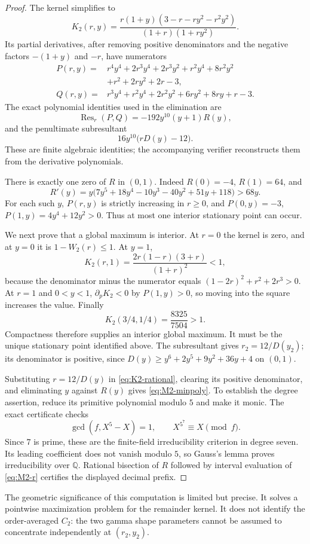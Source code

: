 \begin{proof}
The kernel simplifies to
\begin{equation}\label{eq:K2-rational}
 K_2(r,y)=\frac{r(1+y)(3-r-ry^2-r^2y^2)}{(1+r)(1+ry^2)}.
\end{equation}
Its partial derivatives, after removing positive denominators and
the negative factors $-(1+y)$ and $-r$, have numerators
\begin{align*}
 P(r,y)={}&r^4y^4+2r^3y^4+2r^3y^2+r^2y^4+8r^2y^2\\
          &+r^2+2ry^2+2r-3,\\
 Q(r,y)={}&r^3y^4+r^2y^4+2r^2y^2+6ry^2+8ry+r-3.
\end{align*}
The exact polynomial identities used in the elimination are
\begin{equation}\label{eq:M2-resultant}
 \operatorname{Res}_r(P,Q)=-192y^{10}(y+1)R(y),
\end{equation}
and the penultimate subresultant
\begin{equation}\label{eq:M2-subresultant}
 16y^{10}\bigl(rD(y)-12\bigr).
\end{equation}
These are finite algebraic identities; the accompanying verifier
reconstructs them from the derivative polynomials.

There is exactly one zero of $R$ in $(0,1)$. Indeed $R(0)=-4$,
$R(1)=64$, and
\[
 R'(y)=y\bigl(7y^5+18y^4-10y^3-40y^2+51y+118\bigr)>68y.
\]
For each such $y$, $P(r,y)$ is strictly increasing in $r\ge0$,
and $P(0,y)=-3$, $P(1,y)=4y^4+12y^2>0$. Thus at most one
interior stationary point can occur.

We next prove that a global maximum is interior. At $r=0$ the
kernel is zero, and at $y=0$ it is $1-W_2(r)\le1$. At $y=1$,
\[
 K_2(r,1)=\frac{2r(1-r)(3+r)}{(1+r)^2}<1,
\]
because the denominator minus the numerator equals
$(1-2r)^2+r^2+2r^3>0$. At $r=1$ and $0<y<1$,
$\partial_pK_2<0$ by $P(1,y)>0$, so moving into the square
increases the value. Finally
\[
 K_2(3/4,1/4)=\frac{8325}{7504}>1.
\]
Compactness therefore supplies an interior global maximum.
It must be the unique stationary point identified above.
The subresultant gives $r_2=12/D(y_2)$; its denominator is positive,
since $D(y)\ge y^6+2y^5+9y^2+36y+4$ on $(0,1)$.

Substituting $r=12/D(y)$ in \eqref{eq:K2-rational}, clearing its
positive denominator, and eliminating $y$ against $R(y)$ gives
\eqref{eq:M2-minpoly}. To establish the degree assertion, reduce its
primitive polynomial modulo $5$ and make it monic. The exact certificate
checks
\[
 \gcd(f,X^5-X)=1,\qquad X^{5^7}\equiv X\pmod f.
\]
Since $7$ is prime, these are the finite-field irreducibility criterion
in degree seven. Its leading coefficient does not vanish modulo $5$,
so Gauss's lemma proves irreducibility over $\mathbb Q$.
Rational bisection of $R$ followed by interval evaluation of
\eqref{eq:M2-r} certifies the displayed decimal prefix.
\end{proof}

The geometric significance of this computation is limited but precise.
It solves a pointwise maximization problem for the remainder kernel.
It does not identify the order-averaged $C_2$: the two gamma shape
parameters cannot be assumed to concentrate independently at
$(r_2,y_2)$.

